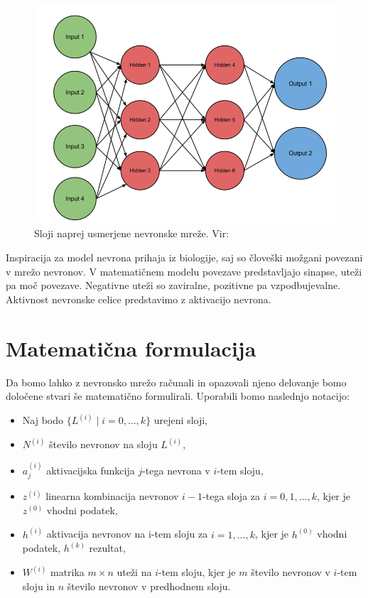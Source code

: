 \begin{figure}[H]
    \centering
    \includegraphics[width=0.7\linewidth]{slike/FeedForwardNN.png}
    \caption{Sloji naprej usmerjene nevronske mreže. Vir: \cite{venkatesh2021role}}
    \label{fig:sloji_nevronske_mreze}
\end{figure}

Inspiracija za model nevrona prihaja iz biologije, saj so človeški možgani povezani v mrežo nevronov. V matematičnem modelu povezave predstavljajo sinapse, uteži pa moč povezave. Negativne uteži so zaviralne, pozitivne pa vzpodbujevalne. Aktivnost nevronske celice predstavimo z aktivacijo nevrona.\cite{10.1007/978-3-319-45378-1_1}


\section{Matematična formulacija}
Da bomo lahko z nevronsko mrežo računali in opazovali njeno delovanje bomo določene stvari še matematično formulirali. Uporabili bomo naslednjo notacijo:
\begin{itemize}
    \item Naj bodo $\{ L^{(i)} \mid i = 0, \dots, k \}$ urejeni sloji,
    \item $N^{(i)}$ število nevronov na sloju $L^{(i)}$,
    \item $a^{(i)}_{j}$ aktivacijska funkcija $j$-tega nevrona v $i$-tem sloju,
    \item $z^{(i)}$ linearna kombinacija nevronov $i-1$-tega sloja za $i = 0, 1, \ldots, k$, kjer je $z^{(0)}$ vhodni podatek,
    \item $h^{(i)}$ aktivacija nevronov na i-tem sloju za $i = 1, \ldots, k$, kjer je $h^{(0)}$ vhodni podatek, $h^{(k)}$ rezultat,
    \item $W^{(i)}$ matrika \(m \times n\) uteži na $i$-tem sloju, kjer je $m$ število nevronov v $i$-tem sloju in $n$ število nevronov v predhodnem sloju.
\end{itemize}

